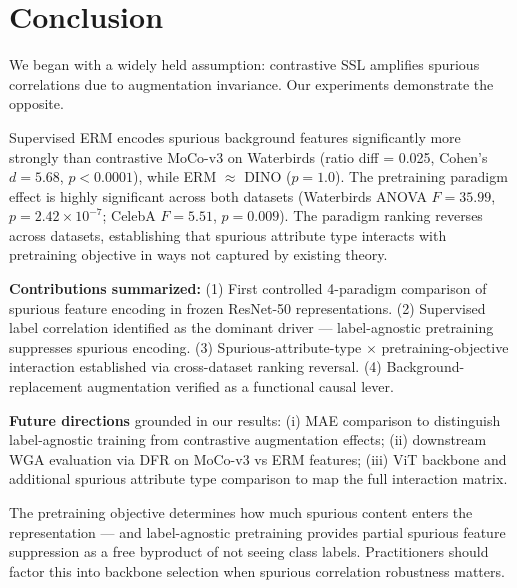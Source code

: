 \section{Conclusion}
\label{sec:conclusion}

We began with a widely held assumption: contrastive SSL amplifies spurious correlations due to augmentation invariance. Our experiments demonstrate the opposite.

Supervised ERM encodes spurious background features significantly more strongly than contrastive MoCo-v3 on Waterbirds (ratio diff = 0.025, Cohen's $d = 5.68$, $p < 0.0001$), while ERM $\approx$ DINO ($p = 1.0$). The pretraining paradigm effect is highly significant across both datasets (Waterbirds ANOVA $F = 35.99$, $p = 2.42 \times 10^{-7}$; CelebA $F = 5.51$, $p = 0.009$). The paradigm ranking reverses across datasets, establishing that spurious attribute type interacts with pretraining objective in ways not captured by existing theory.

\textbf{Contributions summarized:} (1) First controlled 4-paradigm comparison of spurious feature encoding in frozen ResNet-50 representations. (2) Supervised label correlation identified as the dominant driver --- label-agnostic pretraining suppresses spurious encoding. (3) Spurious-attribute-type $\times$ pretraining-objective interaction established via cross-dataset ranking reversal. (4) Background-replacement augmentation verified as a functional causal lever.

\textbf{Future directions} grounded in our results: (i) MAE comparison to distinguish label-agnostic training from contrastive augmentation effects; (ii) downstream WGA evaluation via DFR on MoCo-v3 vs ERM features; (iii) ViT backbone and additional spurious attribute type comparison to map the full interaction matrix.

The pretraining objective determines how much spurious content enters the representation --- and label-agnostic pretraining provides partial spurious feature suppression as a free byproduct of not seeing class labels. Practitioners should factor this into backbone selection when spurious correlation robustness matters.
